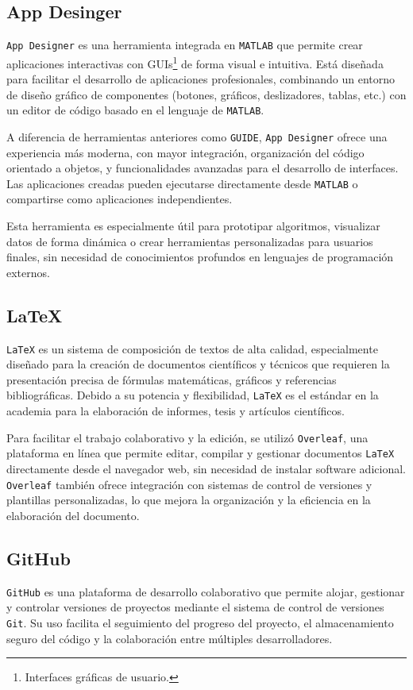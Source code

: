 \subsection{App Desinger}
\texttt{App Designer} \cite{mathworks_matlab} es una herramienta integrada en \texttt{MATLAB} que permite crear aplicaciones interactivas con GUIs\footnote{Interfaces gráficas de usuario.} de forma visual e intuitiva. Está diseñada para facilitar el desarrollo de aplicaciones profesionales, combinando un entorno de diseño gráfico de componentes (botones, gráficos, deslizadores, tablas, etc.) con un editor de código basado en el lenguaje de \texttt{MATLAB}.

A diferencia de herramientas anteriores como \texttt{GUIDE}, \texttt{App Designer} ofrece una experiencia más moderna, con mayor integración, organización del código orientado a objetos, y funcionalidades avanzadas para el desarrollo de interfaces. Las aplicaciones creadas pueden ejecutarse directamente desde \texttt{MATLAB} o compartirse como aplicaciones independientes.

Esta herramienta es especialmente útil para prototipar algoritmos, visualizar datos de forma dinámica o crear herramientas personalizadas para usuarios finales, sin necesidad de conocimientos profundos en lenguajes de programación externos.

\subsection{LaTeX}
\texttt{LaTeX} \cite{latexproject} es un sistema de composición de textos de alta calidad, especialmente diseñado para la creación de documentos científicos y técnicos que requieren la presentación precisa de fórmulas matemáticas, gráficos y referencias bibliográficas. Debido a su potencia y flexibilidad, \texttt{LaTeX} es el estándar en la academia para la elaboración de informes, tesis y artículos científicos.

Para facilitar el trabajo colaborativo y la edición, se utilizó \texttt{Overleaf}, una plataforma en línea que permite editar, compilar y gestionar documentos \texttt{LaTeX} directamente desde el navegador web, sin necesidad de instalar software adicional. \texttt{Overleaf} también ofrece integración con sistemas de control de versiones y plantillas personalizadas, lo que mejora la organización y la eficiencia en la elaboración del documento.

\subsection{GitHub}
\texttt{GitHub} \cite{githubdocs} es una plataforma de desarrollo colaborativo que permite alojar, gestionar y controlar versiones de proyectos mediante el sistema de control de versiones \texttt{Git}. Su uso facilita el seguimiento del progreso del proyecto, el almacenamiento seguro del código y la colaboración entre múltiples desarrolladores.

